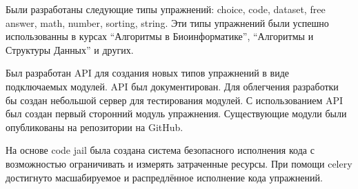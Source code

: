 \documentclass{matmex-diploma-custom}
\begin{document}
Были разработаны следующие типы упражнений: choice, code, dataset,
free answer, math, number, sorting, string. Эти типы упражнений были
успешно использованны в курсах ``Алгоритмы в Биоинформатике'',
``Алгоритмы и Структуры Данных'' и других.

Был разработан API для создания новых типов упражнений в виде
подключаемых модулей. API был документирован. Для облегчения
разработки бы создан небольшой сервер для тестирования модулей. С
использованием API был создан первый сторонний модуль
упражнения. Существующие модули были опубликованы на репозитории на
GitHub.

На основе code jail была создана система безопасного исполнения кода с
возможностью ограничивать и измерять затраченные ресурсы. При помощи
celery достигнуто масшабируемое и распредлённое исполнение кода упражнений.



\end{document}
